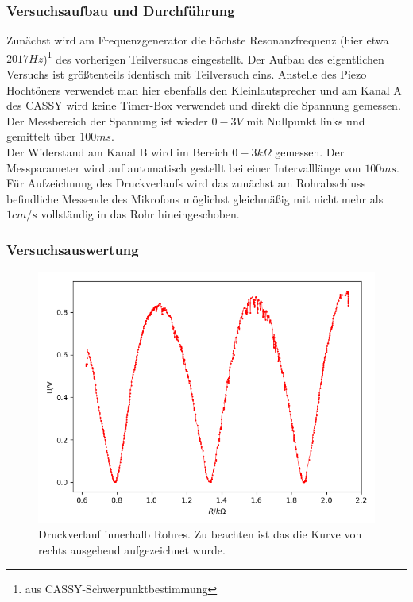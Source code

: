 \documentclass[12pt,a4paper]{article}
\begin{document}
\subsubsection{Versuchsaufbau und Durchführung}
Zunächst wird am Frequenzgenerator die höchste Resonanzfrequenz (hier etwa $2017Hz$)\footnote{aus CASSY-Schwerpunktbestimmung} des vorherigen Teilversuchs eingestellt.
Der Aufbau des eigentlichen Versuchs ist größtenteils identisch mit Teilversuch eins. Anstelle des Piezo Hochtöners verwendet man hier ebenfalls den Kleinlautsprecher und am Kanal A des CASSY wird keine Timer-Box verwendet und direkt die Spannung gemessen. Der Messbereich der Spannung ist wieder $0-3V$ mit Nullpunkt links und gemittelt über $100ms$.\\
Der Widerstand am Kanal B wird im Bereich $0-3k \Omega $ gemessen.
Der Messparameter wird auf automatisch gestellt bei einer Intervalllänge von $100ms$.\\
Für Aufzeichnung des Druckverlaufs wird das zunächst am Rohrabschluss  befindliche Messende des Mikrofons möglichst gleichmäßig mit nicht mehr als $1cm/s$ vollständig in das Rohr hineingeschoben.

\subsubsection{Versuchsauswertung}

\begin{figure}
\includegraphics[width=\linewidth]{druckverlauf}
\caption{Druckverlauf innerhalb Rohres. Zu beachten ist das die Kurve von rechts ausgehend aufgezeichnet wurde.}
\label{Druckverlauf}
\end{figure}
\end{document}
